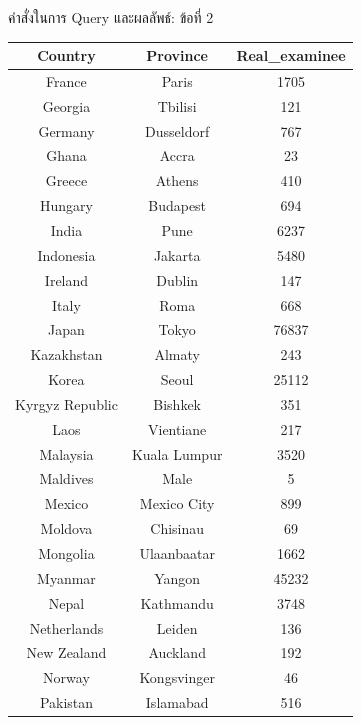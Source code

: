\documentclass{beamer}
\begin{document}
\begin{frame}[fragile]{คำสั่งในการ Query และผลลัพธ์: ข้อที่ 2}
  \begin{tiny}
  \begin{table}
  \begin{tabular}{|c|c|c|}
  \hline
  \textbf{Country} & \textbf{Province} & \textbf{Real\_examinee} \\
  \hline
  France & Paris & 1705 \\
  Georgia & Tbilisi & 121 \\
  Germany & Dusseldorf & 767 \\
  Ghana & Accra & 23 \\
  Greece & Athens & 410 \\
  Hungary & Budapest & 694 \\
  India & Pune & 6237 \\
  Indonesia & Jakarta & 5480 \\
  Ireland & Dublin & 147 \\
  Italy & Roma & 668 \\
  Japan & Tokyo & 76837 \\
  Kazakhstan & Almaty & 243 \\
  Korea & Seoul & 25112 \\
  Kyrgyz Republic & Bishkek & 351 \\
  Laos & Vientiane & 217 \\
  Malaysia & Kuala Lumpur & 3520 \\
  Maldives & Male & 5 \\
  Mexico & Mexico City & 899 \\
  Moldova & Chisinau & 69 \\
  Mongolia & Ulaanbaatar & 1662 \\
  Myanmar & Yangon & 45232 \\
  Nepal & Kathmandu & 3748 \\
  Netherlands & Leiden & 136 \\
  New Zealand & Auckland & 192 \\
  Norway & Kongsvinger & 46 \\
  Pakistan & Islamabad & 516 \\
  \hline
  \end{tabular}
  \end{table}
  \end{tiny}
\end{frame}
\end{document}
